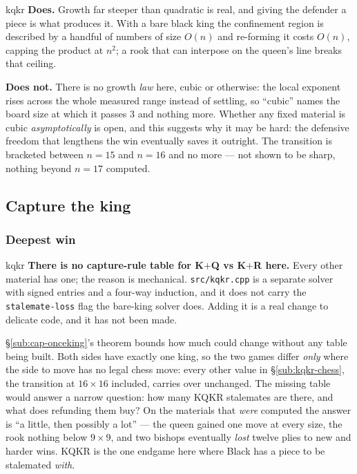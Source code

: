 \documentclass[10pt]{article}
\begin{document}
\begin{result}[title={What this does and does not settle}]{kqkr}
\textbf{Does.} Growth far steeper than quadratic is real, and giving the
defender a piece is what produces it. With a bare black king the confinement
region is described by a handful of numbers of size $O(n)$ and re-forming it
costs $O(n)$, capping the product at $n^2$; a rook that can interpose on the
queen's line breaks that ceiling.

\smallskip
\textbf{Does not.} There is no growth \emph{law} here, cubic or otherwise: the
local exponent rises across the whole measured range instead of settling, so
``cubic'' names the board size at which it passes 3 and nothing more. Whether
any fixed material is cubic \emph{asymptotically} is open, and this suggests
why it may be hard: the defensive freedom that lengthens the win eventually
saves it outright. The transition is bracketed between $n=15$ and $n=16$ and no
more --- not shown to be sharp, nothing beyond $n=17$ computed.
\end{result}

\subsection{Capture the king}\label{sub:kqkr-capture}

\subsubsection{Deepest win}\label{sub:kqkr-cap-law}

\begin{result}[title={The one gap in this document}]{kqkr}
\textbf{There is no capture-rule table for K$+$Q vs K$+$R here.} Every other
material has one; the reason is mechanical. \texttt{src/kqkr.cpp} is a separate
solver with signed entries and a four-way induction, and it does not carry the
\texttt{stalemate-loss} flag the bare-king solver does. Adding it is a real
change to delicate code, and it has not been made.
\end{result}

\noindent
\S\ref{sub:cap-onceking}'s theorem bounds how much could change without any
table being built. Both sides have exactly one king, so the two games differ
\emph{only} where the side to move has no legal chess move: every other value
in \S\ref{sub:kqkr-chess}, the transition at $16\times16$ included, carries
over unchanged. The missing table would answer a narrow question: how many KQKR
stalemates are there, and what does refunding them buy? On the materials that
\emph{were} computed the answer is ``a little, then possibly a lot'' --- the
queen gained one move at every size, the rook nothing below $9\times9$, and two
bishops eventually \emph{lost} twelve plies to new and harder wins. KQKR is the
one endgame here where Black has a piece to be stalemated \emph{with}.
\end{document}
